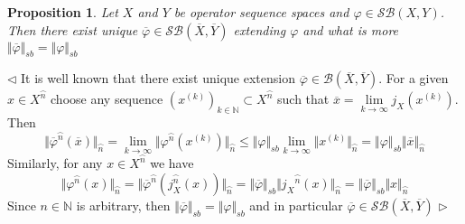 \documentclass[12pt]{article}
\newtheorem{proposition}[theorem]{Proposition}
\newenvironment{proof}{\par $\triangleleft$}{$\triangleright$}
\begin{document}
\begin{proposition}\label{PrExtLinOpByCont} Let $X$ and $Y$ be operator sequence 
spaces and $\varphi\in\mathcal{SB}(X,Y)$. Then there exist unique 
$\overline{\varphi}\in\mathcal{SB}(\overline{X},\overline{Y})$ extending 
$\varphi$ and what is more 
$\Vert \overline{\varphi}\Vert_{sb}=\Vert \varphi\Vert_{sb}$
\end{proposition}
\begin{proof}
It is well known that there exist unique extension 
$\overline{\varphi}\in\mathcal{B}(\overline{X},\overline{Y})$. For a given 
$x\in X^{\wideparen{n}}$ choose any sequence 
${(x^{(k)})}_{k\in\mathbb{N}}\subset X^{\wideparen{n}}$ such that 
$\overline{x}=\lim\limits_{k\to\infty} j_X(x^{(k)})$. Then
$$
\Vert\overline{\varphi}^{\wideparen{n}}(\overline{x})\Vert_{\wideparen{n}}
=\lim\limits_{k\to\infty}\Vert
\varphi^{\wideparen{n}}(x^{(k)})\Vert_{\wideparen{n}} \leq\Vert
\varphi\Vert_{sb}\lim\limits_{k\to\infty}\Vert x^{(k)}\Vert_{\wideparen{n}}
=\Vert \varphi\Vert_{sb}\Vert \overline{x}\Vert_{\wideparen{n}}
$$
Similarly, for any $x\in X^{\wideparen{n}}$ we have
$$
\Vert \varphi^{\wideparen{n}}(x)\Vert_{\wideparen{n}}
=\Vert
    \overline{\varphi}^{\wideparen{n}}(j_X^{\wideparen{n}}(x))
\Vert_{\wideparen{n}}
=\Vert\overline{\varphi}\Vert_{sb}
\Vert
    {j_X}^{\wideparen{n}}(x)
\Vert_{\wideparen{n}}
=\Vert\overline{\varphi}\Vert_{sb}\Vert x\Vert_{\wideparen{n}}
$$
Since $n\in\mathbb{N}$ is arbitrary, then 
$\Vert \overline{\varphi}\Vert_{sb}=\Vert \varphi\Vert_{sb}$ and in particular 
$\overline{\varphi}\in\mathcal{SB}(\overline{X},\overline{Y})$
\end{proof}
\end{document}
